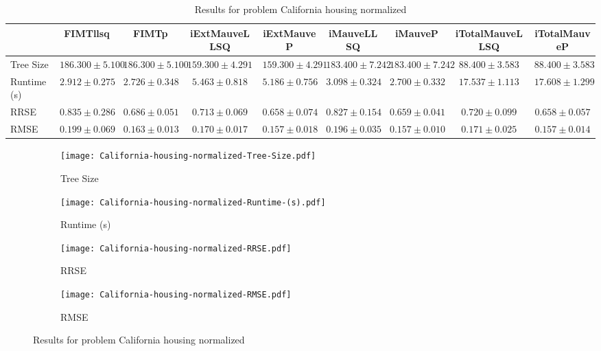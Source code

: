 \documentclass{article}
\begin{document}
\begin{table}[h]
\tiny
\begin{tabular}{|l|c|c|c|c|c|c|c|c|}
\hline
 & FIMTllsq & FIMTp & iExtMauveLLSQ & iExtMauveP & iMauveLLSQ & iMauveP & iTotalMauveLLSQ & iTotalMauveP\\
\hline
Tree Size & $186.300 \pm 5.100$ & $186.300 \pm 5.100$ & $159.300 \pm 4.291$ & $159.300 \pm 4.291$ & $183.400 \pm 7.242$ & $183.400 \pm 7.242$ & \cellcolor{blue!25} $88.400 \pm 3.583$ & \cellcolor{blue!25} $88.400 \pm 3.583$ \\
\hline
Runtime (s) & $2.912 \pm 0.275$ & $2.726 \pm 0.348$ & $5.463 \pm 0.818$ & $5.186 \pm 0.756$ & $3.098 \pm 0.324$ & \cellcolor{blue!25} $2.700 \pm 0.332$ & $17.537 \pm 1.113$ & $17.608 \pm 1.299$ \\
\hline
RRSE & $0.835 \pm 0.286$ & $0.686 \pm 0.051$ & $0.713 \pm 0.069$ & \cellcolor{blue!25} $0.658 \pm 0.074$ & $0.827 \pm 0.154$ & $0.659 \pm 0.041$ & $0.720 \pm 0.099$ & $0.658 \pm 0.057$ \\
\hline
RMSE & $0.199 \pm 0.069$ & $0.163 \pm 0.013$ & $0.170 \pm 0.017$ & \cellcolor{blue!25} $0.157 \pm 0.018$ & $0.196 \pm 0.035$ & $0.157 \pm 0.010$ & $0.171 \pm 0.025$ & $0.157 \pm 0.014$ \\
\hline
\end{tabular}
\caption{Results for problem California housing normalized}
\end{table}
\begin{figure}[h]
\centering
\begin{subfigure}{0.45\textwidth}
  \texttt{[image: California-housing-normalized-Tree-Size.pdf]}
  \caption{Tree Size}
\end{subfigure}
\begin{subfigure}{0.45\textwidth}
  \texttt{[image: California-housing-normalized-Runtime-(s).pdf]}
  \caption{Runtime (s)}
\end{subfigure}
\begin{subfigure}{0.45\textwidth}
  \texttt{[image: California-housing-normalized-RRSE.pdf]}
  \caption{RRSE}
\end{subfigure}
\begin{subfigure}{0.45\textwidth}
  \texttt{[image: California-housing-normalized-RMSE.pdf]}
  \caption{RMSE}
\end{subfigure}
\caption{Results for problem California housing normalized}
\end{figure}
\end{document}
